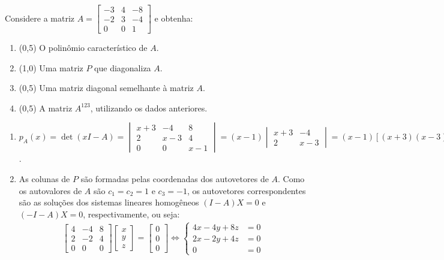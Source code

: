 \documentclass[12pt,a4paper]{article}
\begin{document}
\begin{ExerciseList}
\Exercise[title={2,5}] Considere a matriz $A =
\begin{bmatrix}
-3 & 4 & -8\\
-2 & 3 & -4\\
 0 & 0 &  1
\end{bmatrix}$ e obtenha:
\begin{enumerate}
\item (0,5) O polinômio característico de $A$.
\item (1,0) Uma matriz $P$ que diagonaliza $A$.
\item (0,5) Uma matriz diagonal semelhante à matriz $A$.
\item (0,5) A matriz $A^{123}$, utilizando os dados anteriores.
\end{enumerate}
\Answer
\begin{enumerate}
\item $p_A(x) = \det{(xI - A)} =
\begin{vmatrix}
x+3 &  -4 & 8 \\
  2 & x-3 & 4 \\
  0 &   0 & x-1
\end{vmatrix}
=(x-1)
\begin{vmatrix}
x+3 &  -4\\
  2 & x-3
\end{vmatrix}
=(x-1)[(x+3)(x-3) + 8]
=(x-1)[x^2 - 1]
= (x-1)^2(x+1)
= x^3-x^2-x+1$.
\item As colunas de $P$ são formadas pelas coordenadas dos autovetores de $A$. Como os autovalores de $A$ são $c_1 = c_2 = 1$ e $c_3 = -1$, os autovetores correspondentes são as soluções dos sistemas lineares homogêneos $(I-A)X = 0$ e $(-I-A)X = 0$, respectivamente, ou seja:
\begin{align*}
\begin{bmatrix}
4 & -4 & 8\\
2 & -2 & 4\\
0 &  0 & 0
\end{bmatrix}
\begin{bmatrix}
x\\
y\\
z
\end{bmatrix}
=
\begin{bmatrix}
0\\
0\\
0
\end{bmatrix}
\Leftrightarrow
\begin{cases}
4x-4y+8z&=0\\
2x-2y+4z&=0\\
0&=0
\end{cases}

\end{align*}
\end{enumerate}
\end{ExerciseList}
\end{document}
